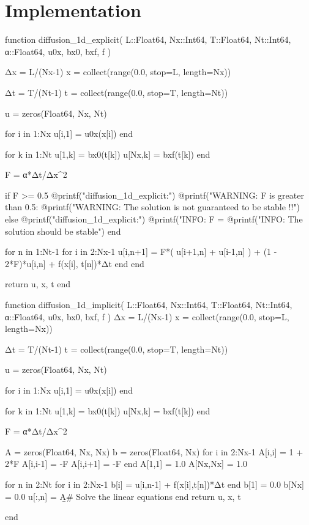\documentclass[a4paper,11pt]{article}
\begin{document}
\section{Implementation}


\begin{juliacode}
function diffusion_1d_explicit(
    L::Float64, Nx::Int64, T::Float64, Nt::Int64,
    α::Float64, u0x, bx0, bxf, f
)
    
    Δx = L/(Nx-1)
    x = collect(range(0.0, stop=L, length=Nx))
    
    Δt = T/(Nt-1)
    t = collect(range(0.0, stop=T, length=Nt))

    u = zeros(Float64, Nx, Nt)
    
    for i in 1:Nx
        u[i,1] = u0x(x[i])
    end
    
    for k in 1:Nt
        u[1,k] = bx0(t[k])
        u[Nx,k] = bxf(t[k])
    end
    
    F = α*Δt/Δx^2
    
    if F >= 0.5
        @printf("diffusion_1d_explicit:\n")
        @printf("WARNING: F is greater than 0.5: %
        @printf("WARNING: The solution is not guaranteed to be stable !!\n")
    else
        @printf("diffusion_1d_explicit:\n")
        @printf("INFO: F = %
        @printf("INFO: The solution should be stable\n")
    end

    for n in 1:Nt-1
        for i in 2:Nx-1
            u[i,n+1] = F*( u[i+1,n] + u[i-1,n] ) + (1 - 2*F)*u[i,n] + f(x[i], t[n])*Δt
        end
    end
    
    return u, x, t
end
\end{juliacode}



\begin{juliacode}
function diffusion_1d_implicit(
    L::Float64, Nx::Int64, T::Float64, Nt::Int64,
    α::Float64, u0x, bx0, bxf, f
)
    Δx = L/(Nx-1)
    x = collect(range(0.0, stop=L, length=Nx))

    Δt = T/(Nt-1)
    t = collect(range(0.0, stop=T, length=Nt))

    u = zeros(Float64, Nx, Nt)

    for i in 1:Nx
        u[i,1] = u0x(x[i])
    end

    for k in 1:Nt
        u[1,k] = bx0(t[k])
        u[Nx,k] = bxf(t[k])
    end

    F = α*Δt/Δx^2
    
    A = zeros(Float64, Nx, Nx)
    b = zeros(Float64, Nx)
    for i in 2:Nx-1
        A[i,i] = 1 + 2*F
        A[i,i-1] = -F
        A[i,i+1] = -F
    end
    A[1,1] = 1.0
    A[Nx,Nx] = 1.0

    for n in 2:Nt
        for i in 2:Nx-1
            b[i] = u[i,n-1] + f(x[i],t[n])*Δt
        end
        b[1] = 0.0
        b[Nx] = 0.0
        u[:,n] = A\b   # Solve the linear equations
    end
    return u, x, t

end
\end{juliacode}
\end{document}
